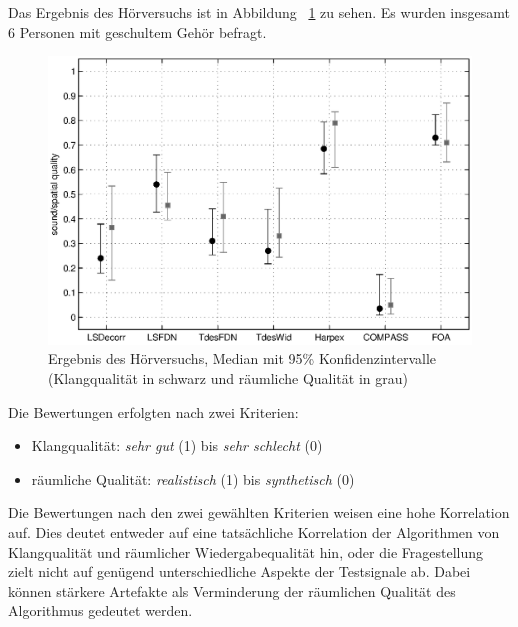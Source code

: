 Das Ergebnis des Hörversuchs ist in Abbildung ~\ref{fig:versuch} zu sehen. Es wurden insgesamt 6 Personen mit geschultem Gehör befragt.

\begin{figure}[!ht]
  \centering
  \includegraphics[width=1\textwidth]{ergebnis/plots/result.eps}
  \caption{Ergebnis des Hörversuchs, Median mit 95\% Konfidenzintervalle (Klangqualität in schwarz und räumliche Qualität in grau)}
  \label{fig:versuch}
\end{figure}

Die Bewertungen erfolgten nach zwei Kriterien:

\begin{itemize}
  \item Klangqualität: \textit{sehr gut} (1) bis \textit{sehr schlecht} (0)
  \item räumliche Qualität: \textit{realistisch} (1) bis \textit{synthetisch} (0)
\end{itemize}

Die Bewertungen nach den zwei gewählten Kriterien weisen eine hohe Korrelation auf. Dies deutet entweder auf eine tatsächliche Korrelation der Algorithmen von Klangqualität und räumlicher Wiedergabequalität hin, oder die Fragestellung zielt nicht auf genügend unterschiedliche Aspekte der Testsignale ab. Dabei können stärkere Artefakte als Verminderung der räumlichen Qualität des Algorithmus gedeutet werden.